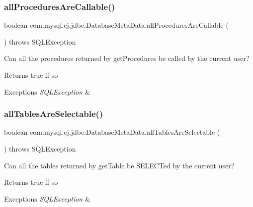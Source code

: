 \subsubsection{\texorpdfstring{all\+Procedures\+Are\+Callable()}{allProceduresAreCallable()}}
{\footnotesize\ttfamily boolean com.\+mysql.\+cj.\+jdbc.\+Database\+Meta\+Data.\+all\+Procedures\+Are\+Callable (\begin{DoxyParamCaption}{ }\end{DoxyParamCaption}) throws S\+Q\+L\+Exception}

Can all the procedures returned by get\+Procedures be called by the current user?

\begin{DoxyReturn}{Returns}
true if so 
\end{DoxyReturn}

\begin{DoxyExceptions}{Exceptions}
{\em S\+Q\+L\+Exception} & \\
\hline
\end{DoxyExceptions}
\mbox{\label{classcom_1_1mysql_1_1cj_1_1jdbc_1_1_database_meta_data_a7e50917c8e8311e43527930167d79b50}} 
\subsubsection{\texorpdfstring{all\+Tables\+Are\+Selectable()}{allTablesAreSelectable()}}
{\footnotesize\ttfamily boolean com.\+mysql.\+cj.\+jdbc.\+Database\+Meta\+Data.\+all\+Tables\+Are\+Selectable (\begin{DoxyParamCaption}{ }\end{DoxyParamCaption}) throws S\+Q\+L\+Exception}

Can all the tables returned by get\+Table be S\+E\+L\+E\+C\+Ted by the current user?

\begin{DoxyReturn}{Returns}
true if so 
\end{DoxyReturn}

\begin{DoxyExceptions}{Exceptions}
{\em S\+Q\+L\+Exception} & \\
\hline
\end{DoxyExceptions}
\mbox{\label{classcom_1_1mysql_1_1cj_1_1jdbc_1_1_database_meta_data_a1c6698693e477a2dc7a76ef58fbc350a}} 
